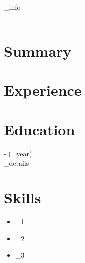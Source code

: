 \documentclass[a4paper,10pt]{article}
\begin{document}
\begin{center}
    \LARGE{{\textbf{{\name}}}} \\
    \normalsize{{\contact_info}} \\
    \normalsize{{\email}} \\
\end{center}

\vspace{0.2cm}

\section*{Summary}
\textit{{\summary}}

\vspace{0.3cm}

\section*{Experience}

\vspace{0.3cm}

\section*{Education}
\textbf{{\degree}} - {{\institution}} ({{\grad_year}}) \\
{{\education_details}}

\vspace{0.3cm}

\section*{Skills}
\begin{itemize}[leftmargin=*]
    \item {{\skill_1}}
    \item {{\skill_2}}
    \item {{\skill_3}}
\end{itemize}
\end{document}
